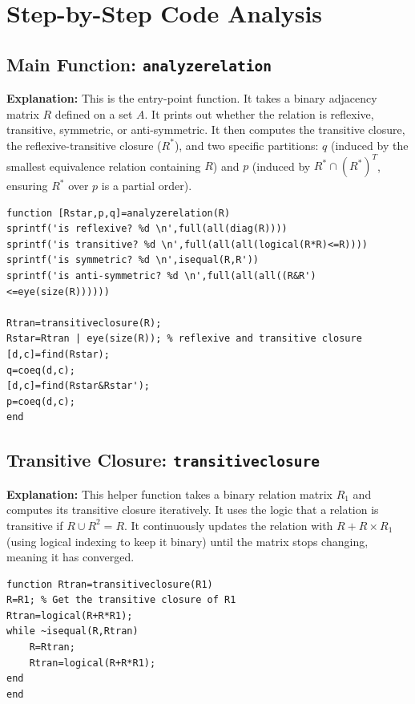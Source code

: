 \section{Step-by-Step Code Analysis}

\subsection{Main Function: \texttt{analyzerelation}}
\textbf{Explanation:} This is the entry-point function. It takes a binary adjacency matrix $R$ defined on a set $A$. It prints out whether the relation is reflexive, transitive, symmetric, or anti-symmetric. It then computes the transitive closure, the reflexive-transitive closure ($R^*$), and two specific partitions: $q$ (induced by the smallest equivalence relation containing $R$) and $p$ (induced by $R^* \cap (R^*)^T$, ensuring $R^*$ over $p$ is a partial order).

\begin{lstlisting}[caption={Main Function Snippet}]
function [Rstar,p,q]=analyzerelation(R)
sprintf('is reflexive? %d \n',full(all(diag(R))))
sprintf('is transitive? %d \n',full(all(all(logical(R*R)<=R))))
sprintf('is symmetric? %d \n',isequal(R,R'))
sprintf('is anti-symmetric? %d \n',full(all(all((R&R')<=eye(size(R))))))

Rtran=transitiveclosure(R);
Rstar=Rtran | eye(size(R)); % reflexive and transitive closure
[d,c]=find(Rstar);
q=coeq(d,c);
[d,c]=find(Rstar&Rstar');
p=coeq(d,c);
end
\end{lstlisting}

\subsection{Transitive Closure: \texttt{transitiveclosure}}
\textbf{Explanation:} This helper function takes a binary relation matrix $R_1$ and computes its transitive closure iteratively. It uses the logic that a relation is transitive if $R \cup R^2 = R$. It continuously updates the relation with $R + R \times R_1$ (using logical indexing to keep it binary) until the matrix stops changing, meaning it has converged.

\begin{lstlisting}[caption={Transitive Closure Snippet}]
function Rtran=transitiveclosure(R1)
R=R1; % Get the transitive closure of R1
Rtran=logical(R+R*R1);
while ~isequal(R,Rtran)
    R=Rtran;
    Rtran=logical(R+R*R1);
end
end
\end{lstlisting}

